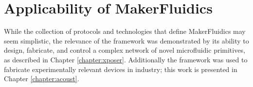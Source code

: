 \section{Applicability of MakerFluidics}
\label{sec:mfApplicability}
While the collection of protocols and technologies that define MakerFluidics may seem simplistic, the relevance of the framework was demonstrated by  its ability to design, fabricate, and control a complex network of novel microfluidic primitives, as described in Chapter \ref{chapter:xposer}. Additionally the framework was used to fabricate experimentally relevant devices in industry; this work is presented in Chapter \ref{chapter:acoust}.
